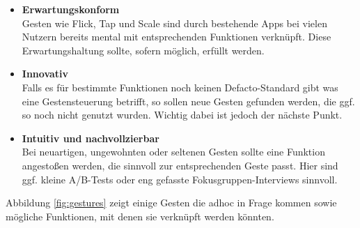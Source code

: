 \documentclass[a4paper,12pt]{article}
\begin{document}
\begin{itemize}
	\item \textbf{Erwartungskonform} \\
		Gesten wie Flick, Tap und Scale sind durch bestehende Apps bei vielen Nutzern bereits mental mit entsprechenden Funktionen verknüpft. Diese Erwartungshaltung sollte, sofern möglich, erfüllt werden.
	\item \textbf{Innovativ} \\
		Falls es für bestimmte Funktionen noch keinen Defacto-Standard gibt was eine Gestensteuerung betrifft, so sollen neue Gesten gefunden werden, die ggf. so noch nicht genutzt wurden. Wichtig dabei ist jedoch der nächste Punkt.
	\item \textbf{Intuitiv und nachvollzierbar} \\
		Bei neuartigen, ungewohnten oder seltenen Gesten sollte eine Funktion angestoßen werden, die sinnvoll zur entsprechenden Geste passt. Hier sind ggf. kleine A/B-Tests oder eng gefasste Fokusgruppen-Interviews sinnvoll.
\end{itemize}

Abbildung \ref{fig:gestures} zeigt einige Gesten die adhoc in Frage kommen sowie mögliche Funktionen, mit denen sie verknüpft werden könnten.
\end{document}
